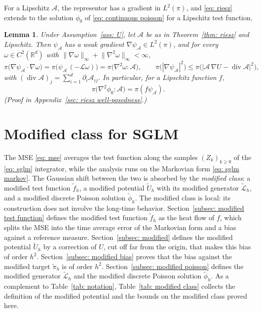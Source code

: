 \documentclass{article}
\newtheorem{lemma}{Lemma}
\newcommand{\Le}{\leqslant}
\newcommand{\Ge}{\geqslant}
\newcommand{\norm}[1]{\lVert #1 \rVert}
\numberwithin{equation}{section}
\begin{document}
For a Lipschitz $\mathcal A$, the representor has a gradient in $L^2(\pi)$, and \eqref{eq: riesz} extends to the solution $\phi_0$ of \eqref{eq: continuous poisson} for a Lipschitz test function.

\begin{lemma}
\label{lem: representor gradient}
    Under Assumption~\ref{ass: U}, let $\mathcal A$ be as in Theorem~\ref{thm: riesz} and Lipschitz. Then $\psi_{\mathcal A}$ has a weak gradient $\nabla \psi_{\mathcal A} \in L^2(\pi)$, and for every $\omega \in C^2(\mathbb R^d)$ with $\norm{\nabla \omega}_\infty + \norm{\nabla^2 \omega}_\infty < \infty$,
    \begin{equation}
        \pi\bigl( \nabla \psi_{\mathcal A} \cdot \nabla \omega \bigr) = \pi\bigl( \psi_{\mathcal A}\, (-\mathcal L \omega) \bigr) = \pi\bigl( \nabla^2 \omega : \mathcal A \bigr) , \qquad
        \pi\bigl( |\nabla \psi_{\mathcal A}|^2 \bigr) \Le \pi\bigl( |\mathcal A\, \nabla U - \operatorname{div} \mathcal A|^2 \bigr) ,
        \label{eq: representor gradient}
    \end{equation}
    with $(\operatorname{div} \mathcal A)_j = \sum_{i=1}^d \partial_i \mathcal A_{ij}$. In particular, for a Lipschitz function $f$,
    \begin{equation}
        \pi\bigl( \nabla^2 \phi_0 : \mathcal A \bigr) = \pi( f \psi_{\mathcal A} ) .
        \label{eq: representor poisson}
    \end{equation}
    \emph{(Proof in Appendix~\ref{sec: riesz well-posedness}.)}
\end{lemma}

\section{Modified class for SGLM}
\label{sec: modified}

The MSE \eqref{eq: mse} averages the test function along the samples $(Z_k)_{k \Ge 0}$ of the \eqref{eq: sglm} integrator, while the analysis runs on the Markovian form \eqref{eq: sglm markov}. The Gaussian shift between the two is absorbed by the \emph{modified class}: a modified test function $\tilde f_h$, a modified potential $\tilde U_h$ with its modified generator $\tilde{\mathcal L}_h$, and a modified discrete Poisson solution $\tilde\phi_h$. The modified class is local: its construction does not involve the long-time behavior. Section~\ref{subsec: modified test function} defines the modified test function $\tilde f_h$ as the heat flow of $f$, which splits the MSE into the time average error of the Markovian form and a bias against a reference measure. Section~\ref{subsec: modified} defines the modified potential $\tilde U_h$ by a correction of $U$, cut off far from the origin, that makes this bias of order $h^2$. Section~\ref{subsec: modified bias} proves that the bias against the modified target $\tilde\pi_h$ is of order $h^2$. Section~\ref{subsec: modified poisson} defines the modified generator $\tilde{\mathcal L}_h$ and the modified discrete Poisson solution $\tilde\phi_h$. As a complement to Table~\ref{tab: notation}, Table~\ref{tab: modified class} collects the definition of the modified potential and the bounds on the modified class proved here.
\end{document}
